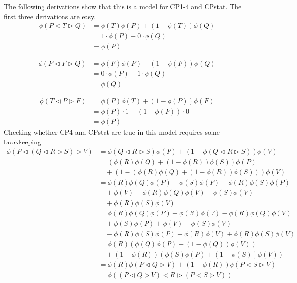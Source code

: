 \documentclass[a4paper,twoside,openright]{report}
\newcommand{\lef}{\ensuremath{\triangleleft}}
\newcommand{\rig}{\ensuremath{\triangleright}}
\begin{document}
The following derivations show that this is a model for CP1-4 and CPstat. The first three derivations are easy.
\begin{align*}
\phi(P\lef T\rig Q) &= \phi(T)\phi(P) + (1-\phi(T))\phi(Q)\\
&= 1\cdot\phi(P) + 0\cdot\phi(Q)\\
&= \phi(P)
\end{align*}

\begin{align*}
\phi(P\lef F\rig Q) &= \phi(F)\phi(P) + (1-\phi(F))\phi(Q)\\
&= 0\cdot\phi(P) + 1\cdot\phi(Q)\\
&= \phi(Q)
\end{align*}

\begin{align*}
\phi(T\lef P\rig F) &= \phi(P)\phi(T) + (1-\phi(P))\phi(F)\\
&=\phi(P)\cdot 1+ (1-\phi(P))\cdot 0\\
&=\phi(P)
\end{align*}
Checking whether CP4 and CPstat are true in this model requires some bookkeeping.
\begin{align*}
\phi(P\lef(Q\lef R\rig S)\rig V)
&= \phi(Q\lef R\rig S)\phi(P)+(1-\phi(Q\lef R\rig S))\phi(V)\\
&= (\phi(R)\phi(Q)+(1-\phi(R))\phi(S))\phi(P)\\
&\quad +(1-(\phi(R)\phi(Q)+(1-\phi(R))\phi(S)))\phi(V)\\
&= \phi(R)\phi(Q)\phi(P) + \phi(S)\phi(P) - \phi(R)\phi(S)\phi(P)\\
&\quad  + \phi(V) - \phi(R)\phi(Q)\phi(V) - \phi(S)\phi(V)\\
&\quad  + \phi(R)\phi(S)\phi(V)\\
&= \phi(R)\phi(Q)\phi(P)+\phi(R)\phi(V)-\phi(R)\phi(Q)\phi(V)\\
&\quad + \phi(S)\phi(P) + \phi(V) - \phi(S)\phi(V)\\
&\quad - \phi(R)\phi(S)\phi(P) - \phi(R)\phi(V) + \phi(R)\phi(S)\phi(V)\\
&= \phi(R)(\phi(Q)\phi(P)+(1-\phi(Q))\phi(V))\\
&\quad  + (1-\phi(R))(\phi(S)\phi(P)+(1-\phi(S))\phi(V))\\
&= \phi(R)\phi(P\lef Q\rig V)+(1-\phi(R))\phi(P\lef S\rig V)\\
&= \phi((P\lef Q\rig V)\lef R\rig(P\lef S\rig V))
\end{align*}
\end{document}
